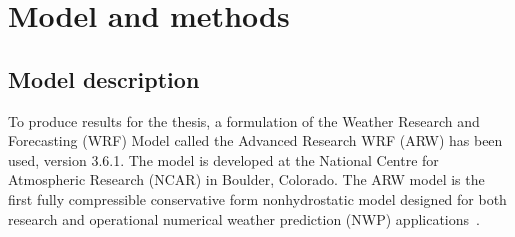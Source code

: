 \chapter{Model and methods}
\label{chap:modmet}
\section{Model description}
\label{sec:modeldes}
To produce results for the thesis, a formulation of the Weather Research and Forecasting (WRF) Model called the Advanced Research WRF (ARW) has been used, version 3.6.1. The model is developed at the National Centre for Atmospheric Research (NCAR) in Boulder, Colorado. The ARW model is the first fully compressible conservative form nonhydrostatic model designed for both research and operational numerical weather prediction (NWP) applications~\citep{Skamarock2008}.


